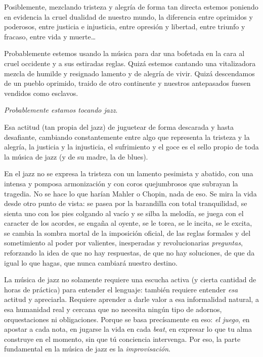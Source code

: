 \documentclass[]{article}
\begin{document}
Posiblemente, mezclando tristeza y alegría de forma tan directa estemos poniendo en evidencia la cruel dualidad de nuestro mundo, la diferencia entre oprimidos y poderosos, entre justicia e injusticia, entre opresión y libertad, entre triunfo y fracaso, entre vida y muerte\ldots{}

Probablemente estemos usando la música para dar una bofetada en la cara al cruel occidente y a sus estiradas reglas. Quizá estemos cantando una vitalizadora mezcla de humilde y resignado lamento y de alegría de vivir. Quizá descendamos de un pueblo oprimido, traido de otro continente y nuestros antepasados fuesen vendidos como esclavos.

\emph{Probablemente estamos tocando jazz}.

Esa actitud (tan propia del jazz) de juguetear de forma descarada y hasta desafiante, cambiando constantemente entre algo que representa la tristeza y la alegría, la justicia y la injusticia, el sufrimiento y el goce es el sello propio de toda la música de jazz (y de su madre, la de blues).

En el jazz no se expresa la tristeza con un lamento pesimista y abatido, con una intensa y pomposa armonización y con coros quejumbrosos que subrayan la tragedia. No se hace lo que harían Mahler o Chopin, nada de eso. Se mira la vida desde otro punto de vista: se pasea por la barandilla con total tranquilidad, se sienta uno con los pies colgando al vacío y se silba la melodía, se juega con el caracter de los acordes, se engaña al oyente, se le torea, se le incita, se le excita, se cambia la sombra mortal de la imposición oficial, de las reglas formales y del sometimiento al poder por valientes, inesperadas y revolucionarias \emph{preguntas}, reforzando la idea de que no hay respuestas, de que no hay soluciones, de que da igual lo que hagas, que nunca cambiará nuestro destino.

La música de jazz no solamente requiere una escucha activa (y cierta cantidad de horas de práctica) para entender el lenguaje: también requiere entender \emph{esa} actitud y apreciarla. Requiere aprender a darle valor a esa informalidad natural, a esa humanidad real y cercana que no necesita ningún tipo de adornos, orquestaciones ni obligaciones. Porque se basa precísamente en eso: \emph{el juego}, en apostar a cada nota, en jugarse la vida en cada \emph{beat}, en expresar lo que tu alma construye en el momento, sin que tú conciencia intervenga. Por eso, la parte fundamental en la música de jazz es la \emph{improvisación}.
\end{document}
